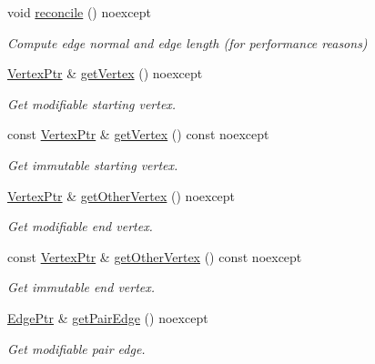 \begin{DoxyCompactItemize}
\mbox{\label{classDcel_1_1EdgeT_ac4aaf294fd41c84ef2f7f54a8024e6dd}} 
void \hyperlink{classDcel_1_1EdgeT_ac4aaf294fd41c84ef2f7f54a8024e6dd}{reconcile} () noexcept
\begin{DoxyCompactList}\small\item\em Compute edge normal and edge length (for performance reasons) \end{DoxyCompactList}\item 
\hyperlink{classDcel_1_1EdgeT_ab4ba57cfc6b2f90da43096eea87bb284}{Vertex\+Ptr} \& \hyperlink{classDcel_1_1EdgeT_a44193130714264f57d80e7bfc8264662}{get\+Vertex} () noexcept
\begin{DoxyCompactList}\small\item\em Get modifiable starting vertex. \end{DoxyCompactList}\item 
const \hyperlink{classDcel_1_1EdgeT_ab4ba57cfc6b2f90da43096eea87bb284}{Vertex\+Ptr} \& \hyperlink{classDcel_1_1EdgeT_afa36dc535018588ba2238c5f42a9abd8}{get\+Vertex} () const noexcept
\begin{DoxyCompactList}\small\item\em Get immutable starting vertex. \end{DoxyCompactList}\item 
\hyperlink{classDcel_1_1EdgeT_ab4ba57cfc6b2f90da43096eea87bb284}{Vertex\+Ptr} \& \hyperlink{classDcel_1_1EdgeT_aaa6ae21b177a7661ba61ad2b63ed47f3}{get\+Other\+Vertex} () noexcept
\begin{DoxyCompactList}\small\item\em Get modifiable end vertex. \end{DoxyCompactList}\item 
const \hyperlink{classDcel_1_1EdgeT_ab4ba57cfc6b2f90da43096eea87bb284}{Vertex\+Ptr} \& \hyperlink{classDcel_1_1EdgeT_ac2b40be7e45425caaf85b13b50bd89a0}{get\+Other\+Vertex} () const noexcept
\begin{DoxyCompactList}\small\item\em Get immutable end vertex. \end{DoxyCompactList}\item 
\hyperlink{classDcel_1_1EdgeT_af525f4228d820f6b8b23fc02d937e4c8}{Edge\+Ptr} \& \hyperlink{classDcel_1_1EdgeT_a1a076a12b7e269aecd77172b1d4c57e1}{get\+Pair\+Edge} () noexcept
\begin{DoxyCompactList}\small\item\em Get modifiable pair edge. \end{DoxyCompactList}\item 

\end{DoxyCompactItemize}
